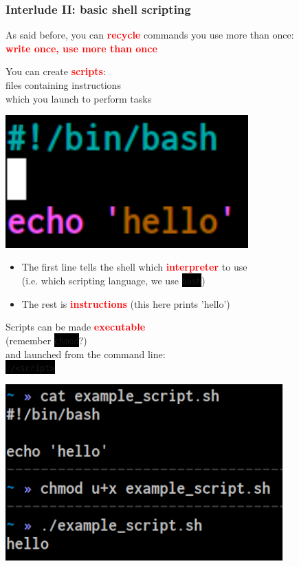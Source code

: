 \documentclass[unknownkeysallowed, 10pt, a4 paper, handout]{beamer}
\newcommand{\focus}[1]{\textbf{\textcolor{red}{#1}}}
\newcommand{\code}[1]{\colorbox{black}{\color{green}\texttt{#1}}}
\newcommand{\sidebyside}[5]{
  \begin{minipage}{#1\textwidth}
    #2
  \end{minipage} #3 \begin{minipage}{#4\textwidth}
    #5
  \end{minipage}
}
\begin{document}
\begin{frame}
\begin{center}
  \end{center}
\end{frame}


\begin{frame}
  \begin{center}
    \frametitle{Interlude II: basic shell scripting}

    As said before, you can \focus{recycle} commands you use more than once:\\
    \focus{write once, use more than once}

    \sidebyside{0.50}{
      You can create \focus{scripts}:\\
      files containing instructions\\
      which you launch to perform tasks
    }{\hfill}{0.45}{
      \begin{center}
        \includegraphics[width=0.70\textwidth]{pics/script_1.png}
      \end{center}
    }

    \begin{itemize}
      \item The first line tells the shell which \focus{interpreter} to use\\
        (i.e. which scripting language, we use \code{bash})
      \item The rest is \focus{instructions} (this here prints 'hello')
    \end{itemize}

    \sidebyside{0.50}{
      Scripts can be made \focus{executable}\\
      (remember \code{chmod}?)\\
      and launched from the command line:\\
      \code{./<script>}
    }{\hfill}{0.45}{
      \begin{center}
        \includegraphics[width=0.80\textwidth]{pics/script_2.png}
      \end{center}
    }
  \end{center}
\end{frame}
\end{document}
